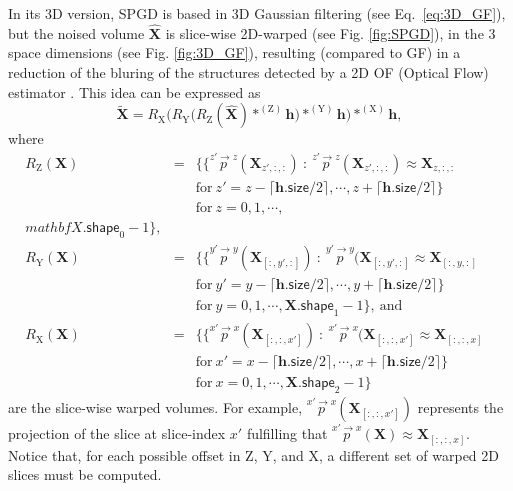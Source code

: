 \documentclass{article}
\begin{document}
In its 3D version, SPGD is based in 3D Gaussian filtering (see
Eq.~\ref{eq:3D_GF}), but the noised volume $\hat{\mathbf{X}}$ is
slice-wise 2D-warped (see Fig. \ref{fig:SPGD}), in the 3 space
dimensions (see Fig. \ref{fig:3D_GF}), resulting (compared to GF) in a
reduction of the bluring of the structures detected by a 2D OF
(Optical Flow) estimator \cite{gonzalez2023structure}. This idea can
be expressed as
\begin{equation}
  \tilde{\mathbf{X}}  = R_\text{X}\Big(R_\text{Y}\big(R_\text{Z}(\hat{\mathbf{X}})*^{(\text{Z})}{\mathbf h}\big)*^{(\text{Y})}{\mathbf h}\Big)*^{(\text{X})}{\mathbf h},
    \label{eq:SDPG}
\end{equation}
where
\begin{equation*}
  \begin{array}{rclll}
    R_\text{Z}(\mathbf{X}) & = & \big\{ \{ \overset{z'\rightarrow z}p(\mathbf{X}_{z',:,:})~:~\overset{z'\rightarrow z}p(\mathbf{X}_{z',:,:})\approx\mathbf{X}_{z,:,:} & \\ & & \text{for}~z'=z-\lceil\mathbf{h}.\mathsf{size}/2\rceil,\cdots,z+\lceil\mathbf{h}.\mathsf{size}/2\rceil\} & \\ & & \text{for}~z=0,1,\cdots,\\mathbf{X}.\mathsf{shape}_0-1\big\}, \\
    R_\text{Y}(\mathbf{X}) & = & \big\{ \{ \overset{y'\rightarrow y}p(\mathbf{X}_{[:,y',:]})~:~\overset{y'\rightarrow y}p(\mathbf{X}_{[:,y',:]}\approx\mathbf{X}_{[:,y,:]} & \\ & & \text{for}~y'=y-\lceil\mathbf{h}.\mathsf{size}/2\rceil,\cdots,y+\lceil\mathbf{h}.\mathsf{size}/2\rceil\} & \\ & & \text{for}~y=0,1,\cdots,\mathbf{X}.\mathsf{shape}_1-1\big\},~\text{and} \\
    R_\text{X}(\mathbf{X}) & = & \big\{ \{ \overset{x'\rightarrow x}p(\mathbf{X}_{[:,:,x']})~:~\overset{x'\rightarrow x}p(\mathbf{X}_{[:,:,x']}\approx\mathbf{X}_{[:,:,x]} & \\ & & \text{for}~x'=x-\lceil\mathbf{h}.\mathsf{size}/2\rceil,\cdots,x+\lceil\mathbf{h}.\mathsf{size}/2\rceil\} & \\ & & \text{for}~x=0,1,\cdots,\mathbf{X}.\mathsf{shape}_2-1\big\}
    \end{array}
\end{equation*}
are the slice-wise warped volumes. For example,
$\overset{x'\rightarrow x}p(\mathbf{X}_{[:,:,x']})$ represents the
projection of the slice at slice-index $x'$ fulfilling that
$\overset{x'\rightarrow
  x}p({\mathbf{X}})\approx{\mathbf{X}}_{[:,:,x]}$. Notice that, for
each possible offset in $\text{Z}$, $\text{Y}$, and $\text{X}$, a
different set of warped 2D slices must be computed.
\end{document}
